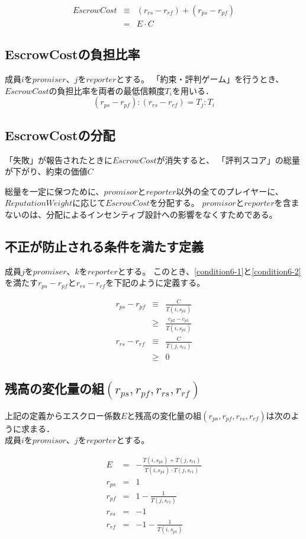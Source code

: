 \begin{eqnarray}
  EscrowCost  &\equiv& (r_{rs} - r_{rf}) + (r_{ps} - r_{pf}) \\
              &=& E \cdot C \label{escrowCost}
\end{eqnarray}

\subsection{EscrowCostの負担比率}
成員$i$を$promiser$、$j$を$reporter$とする。
「約束・評判ゲーム」を行うとき、$EscrowCost$の負担比率を両者の最低信頼度$T_i$を用いる．\\

\begin{equation}
  (r_{ps} - r_{pf}):(r_{rs} - r_{rf}) = T_j:T_i
\end{equation}

\subsection{EscrowCostの分配}
「失敗」が報告されたときに$EscrowCost$が消失すると、
「評判スコア」の総量が下がり、約束の価値$C$

総量を一定に保つために、$promisor$と$reporter$以外の全てのプレイヤーに、
$ReputationWeight$に応じて$EscrowCost$を分配する。
$promisor$と$reporter$を含まないのは、分配によるインセンティブ設計への影響をなくすためである。

\subsection{不正が防止される条件を満たす定義}
成員$j$を$promiser$、$k$を$reporter$とする。
このとき、\eqref{condition6-1}と\eqref{condition6-2}を満たす$r_{ps} - r_{pf}$と$r_{rs} - r_{rf}$を下記のように定義する。

\begin{eqnarray}
  r_{ps} - r_{pf} &\equiv& \frac{C}{T(i, s_{p1})} \label{condition6-3} \\
                  &\geq& \frac{c_{p2} - c_{p1}}{T(i, s_{p1})} \nonumber \\
  r_{rs} - r_{rf} &\equiv& \frac{C}{T(j, s_{r1})} \label{condition6-4} \\
                  &\geq& 0 \nonumber
\end{eqnarray}

\subsection{残高の変化量の組$ (r_{ps}, r_{pf}, r_{rs}, r_{rf}) $}
上記の定義からエスクロー係数$E$と残高の変化量の組$ (r_{ps}, r_{pf}, r_{rs}, r_{rf}) $は次のように求まる． \\
成員$i$を$promisor$、$j$を$reporter$とする。

\begin{eqnarray}
  E &=& - \frac{T(i, s_{p1}) + T(j, s_{r1})}{T(i, s_{p1}) \cdot T(j, s_{r1})} \\
  r_{ps} &=& 1 \\
  r_{pf} &=& 1 - \frac{1}{T(j, s_{r1})} \\
  r_{rs} &=& -1 \\
  r_{rf} &=& -1 - \frac{1}{T(i, s_{p1})}
\end{eqnarray}

